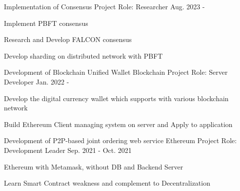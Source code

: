 

\begin{cventries}

  \cventry
    {Implementation of Consensus} %
    {Project} %
    {Role: Researcher} %
    {Aug. 2023 -} %
    {
      \begin{cvitems} %
        \item {Implement PBFT consensus}
        \item {Research and Develop FALCON consensus}
        \item {Develop sharding on distributed network with PBFT}
      \end{cvitems}
    }


  \cventry
    {Development of Blockchain Unified Wallet} %
    {Blockchain Project} %
    {Role: Server Developer} %
    {Jan. 2022 -} %
    {
      \begin{cvitems} %
        \item {Develop the digital currency wallet which supports with various blockchain network}
        \item {Build Ethereum Client managing system on server and Apply to application}
      \end{cvitems}
    }

  \cventry
    {Development of P2P-based joint ordering web service} %
    {Ethereum Project} %
    {Role: Development Leader} %
    {Sep. 2021 - Oct. 2021} %
    {
      \begin{cvitems} %
        \item {Ethereum with Metamask, without DB and Backend Server}
        \item {Learn Smart Contract weakness and complement to Decentralization}
      \end{cvitems}
    }
    

\end{cventries}
